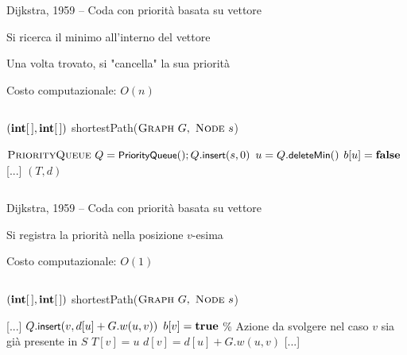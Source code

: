\begin{frame}{Dijkstra, 1959 -- Coda con priorità basata su vettore}

\vspace{-9pt}
\begin{myboxtitle}
\BI
\item Si ricerca il minimo all'interno del vettore
\item Una volta trovato, si "cancella" la sua priorità
\item Costo computazionale: $O(n)$
\EI
\end{myboxtitle}
    
\vspace{-18pt}
\begin{columns}
\small
\begin{Procedure}
\caption[A]{$(\INTARRAY, \INTARRAY)$ \textsf{shortestPath}($\textsc{Graph}\ G,\ \textsc{Node}\ s$)}
$\textsc{PriorityQueue}\ Q = \textsf{{\small PriorityQueue}}(); Q.\textsf{{\small insert}}(s, 0)$\;
{
  \alert{$u = Q.\textsf{{\small deleteMin}}()$}\;
  $b[u] = \FALSE$\;
  {
    {
      [...]
    }
  }
}
\Return $(T,d)$
\end{Procedure}
\end{columns}

\end{frame}

\begin{frame}{Dijkstra, 1959 -- Coda con priorità basata su vettore}

\vspace{-9pt}
\begin{myboxtitle}
\BI
\item Si registra la priorità nella posizione $v$-esima
\item Costo computazionale: $O(1)$
\EI
\end{myboxtitle}

\vspace{-18pt}
\begin{columns}
\small
\begin{Procedure}
\caption[A]{$(\INTARRAY, \INTARRAY)$ \textsf{shortestPath}($\textsc{Graph}\ G,\ \textsc{Node}\ s$)}
[...]\;
    {
      {
        \alert{$Q.\textsf{{\small insert}}(v, d[u]+G.w(u,v))$}\;
        $b[v] = \TRUE$\;
      }
      {
        \% Azione da svolgere nel caso $v$ sia già presente in $S$
      }
      $T[v] = u$\;
      $d[v] = d[u] + G.w(u,v)$\;
    }
[...]\;
\end{Procedure}
\end{columns}

\end{frame}


